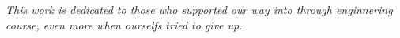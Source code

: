 \begin{dedication}
   \vspace*{\fill}
   \centering
   \noindent
   \textit{ This work is dedicated to those who supported our way into through
   enginnering course, even more when ourselfs tried to give up. } \vspace*{\fill}
\end{dedication}
